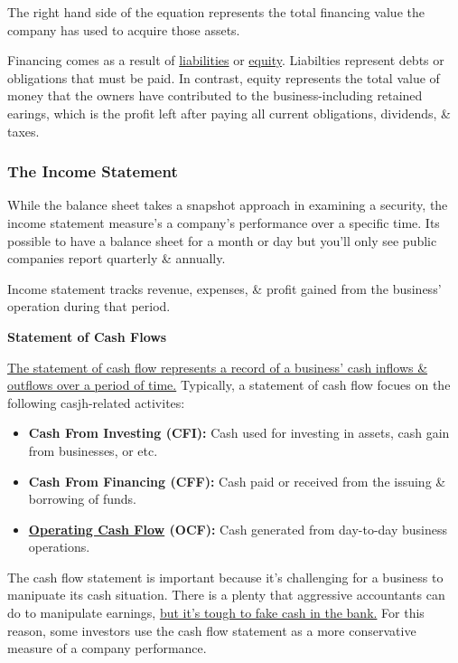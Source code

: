 \documentclass{article}
\begin{document}
	The right hand side of the equation represents the total financing value the company has used to acquire those assets. \newline

	Financing comes as a result of \href{https://www.investopedia.com/terms/l/liability.asp}{liabilities} or \href{https://www.investopedia.com/terms/e/equity.asp}{equity}. Liabilties represent debts
	or obligations that must be paid. In contrast, equity represents the total value of money that the owners have contributed to the business-including retained earings, which is the profit left 
	after paying all current obligations, dividends, \& taxes. \newline

	\subsubsection{The Income Statement}
	
	While the balance sheet takes a snapshot approach in examining a security, the income statement measure's a company's performance over a specific time. Its possible to have a balance sheet for a
	month or day but you'll only see public companies report quarterly \& annually. \newline

	Income statement tracks revenue, expenses, \& profit gained from the business' operation during that period.

	{\bf Statement of Cash Flows} \newline

	\underline{The statement of cash flow represents a record of a business' cash inflows \& outflows over a period of time.} Typically, a statement of cash flow focues on the following casjh-related
	activites:

	\begin{itemize}
		\item {\bf Cash From Investing (CFI):} Cash used for investing in assets, cash gain from businesses, or etc.
		\item {\bf Cash From Financing (CFF):} Cash paid or received from the issuing \& borrowing of funds.
		\item {\bf \href{https://www.investopedia.com/terms/o/operatingt-cashflow.asp}{Operating Cash Flow} (OCF):} Cash generated from day-to-day business operations.
	\end{itemize}

	The cash flow statement is important because it's challenging for a business to manipuate its cash situation. There is a plenty that aggressive accountants can do to manipulate earnings, \underline{but it's
	tough to fake cash in the bank.} For this reason, some investors use the cash flow statement as a more conservative measure of a company performance. \newline \newline
\end{document}
